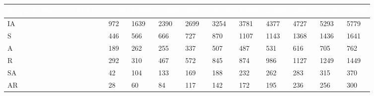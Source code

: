 \begin{table}[t]
\centering
\begin{tabular}{|l|l|l|l|l|l|l|l|l|l|l|}   
\hline  \rowcolor{black} \scriptsize \bf \textcolor {white}{ Requests Number (ASMS)}
& \scriptsize \bf \textcolor {white}{5000}
& \scriptsize \bf \textcolor {white}{10000}
& \scriptsize \bf \textcolor  {white}{15000}
& \scriptsize \bf \textcolor  {white}{20000}
& \scriptsize \bf \textcolor  {white}{25000}
& \scriptsize \bf \textcolor  {white}{30000} 
& \scriptsize \bf \textcolor  {white}{35000}
& \scriptsize \bf \textcolor  {white}{40000}
& \scriptsize \bf \textcolor  {white}{45000}
& \scriptsize \bf \textcolor {white}{50000}\\ \hline



\scriptsize  {IA }
& \scriptsize  {972}
& \scriptsize {1639}
& \scriptsize {2390}
& \scriptsize {2699}
& \scriptsize {3254}
& \scriptsize {3781}
& \scriptsize {4377}
& \scriptsize {4727}
& \scriptsize {5293}
& \scriptsize {5779}
\\ \hline


\scriptsize  {S }
& \scriptsize  {446}
& \scriptsize {566}
& \scriptsize {666}
& \scriptsize {727}
& \scriptsize {870}
& \scriptsize {1107}
& \scriptsize {1143}
& \scriptsize {1368}
& \scriptsize {1436}
& \scriptsize {1641}
\\ \hline

\scriptsize  {A}
& \scriptsize  {189}
& \scriptsize {262}
& \scriptsize {255}
& \scriptsize {337}
& \scriptsize {507}
& \scriptsize {487}
& \scriptsize {531}
& \scriptsize {616}
& \scriptsize {705}
& \scriptsize {762}
\\ \hline

									
\scriptsize  {R}
& \scriptsize  {292}
& \scriptsize {310}
& \scriptsize {467}
& \scriptsize {572}
& \scriptsize {845}
& \scriptsize {874}
& \scriptsize {986}
& \scriptsize {1127}
& \scriptsize {1249}
& \scriptsize {1449}
\\ \hline


\scriptsize  {SA}
& \scriptsize  {42}
& \scriptsize {104}
& \scriptsize {133}
& \scriptsize {169}
& \scriptsize {188}
& \scriptsize {232}
& \scriptsize {262}
& \scriptsize {283}
& \scriptsize {315}
& \scriptsize {370}
\\ \hline

\scriptsize  {AR}
& \scriptsize  {28}
& \scriptsize {60}
& \scriptsize {84}
& \scriptsize {117}
& \scriptsize {142}
& \scriptsize {172}
& \scriptsize {195}
& \scriptsize {236}
& \scriptsize {256}
& \scriptsize {300}
\\ \hline


\end{tabular}
\end{table}
